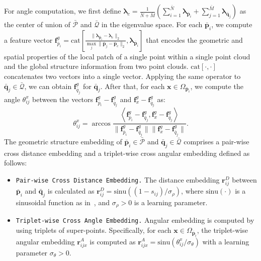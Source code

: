 For angle computation, we first define $\bm{\lambda}_c=\frac{1}{\bar{N}+\bar{M}}\left(\sum_{i=1}^{\bar{N}}\bm{\lambda}_{\bar{\bm{p}}_i} + \sum_{j=1}^{\bar{M}}\bm{\lambda}_{\bar{\bm{q}}_j}\right)$ as the center of union of $\bar{\bm{\mathcal{P}}}$ and $\bar{\bm{\mathcal{Q}}}$ in the eigenvalue space.
For each $\bar{\bm{p}}_i$, we compute a feature vector
$\bm{f}^g_{\bar{p}_i}= \mbox{cat}\left[\frac{\|\bm{\lambda}_{\bar{\bm{p}}_i}-{\bm{\lambda}}_c\|_2}{\max\limits_j\|\bar{\bm{p}}_j-\bar{\bm{p}}_c\|_2},\bm{\lambda}_{\bar{\bm{p}}_i}\right]$ that encodes the geometric and spatial properties of the local patch of a single point within a single point cloud and the global structure information from two point clouds.
$\mbox{cat}[\cdot, \cdot]$ concatenates two vectors into a single vector.
Applying the same operator to $\bar{\bm{q}}_j\in\bar{\bm{\mathcal{Q}}}$, we can obtain $\bm{f}^g_{\bar{q}_j}$ for $\bar{\bm{q}}_j$.
After that, for each ${\bm{x}\in\Omega_{\bar{\bm{p}}_i}}$, we compute the angle $\theta^x_{ij}$ between the vectors $\bm{f}^g_{\bar{p}_i}-\bm{f}^g_{\bar{q}_j}$ and $\bm{f}^g_{x}-\bm{f}^g_{\bar{q}_j}$ as:
\begin{equation}
    \theta^x_{ij} =\arccos\frac{\left<\bm{f}^g_{\bar{p}_i}-\bm{f}^g_{\bar{q}_j}, \bm{f}^g_{x}-\bm{f}^g_{\bar{q}_j}\right>}{\|\bm{f}^g_{\bar{p}_i}-\bm{f}^g_{\bar{q}_j}\|\| \bm{f}^g_{x}-\bm{f}^g_{\bar{q}_j}\|}.
\end{equation}
The geometric structure embedding of $\bar{\bm{p}}_i\in \bar{\bm{\mathcal{P}}}$ and $\bar{\bm{q}}_j\in \bar{\bm{\mathcal{Q}}}$ comprises a pair-wise cross distance embedding and a triplet-wise cross angular embedding defined as follows:
\begin{itemize}[noitemsep,topsep=0pt,leftmargin=*]
    \item{\verb|Pair-wise Cross Distance Embedding.|} The distance embedding $\bm{r}^D_{ij}$ between $\bar{\bm{p}}_i$ and $\bar{\bm{q}}_j$ is calculated as $\bm{r}^D_{ij}{=}\mbox{sinu}(\left(1-s_{ij}\right) {/} \sigma_{\rho})$, where $\mbox{sinu}(\cdot)$ is a sinusoidal function as in~\cite{vaswani2017attention}, and $\sigma_{\rho}{>}0$ is a learning parameter.
    \item{\verb|Triplet-wise Cross Angle Embedding.|} Angular embedding is computed by using triplets of super-points. 
    Specifically, for each ${\bm{x}\in\Omega_{\bar{\bm{p}}_i}}$, the triplet-wise angular embedding $\bm{r}^A_{ijx}$ is computed as 
    $\bm{r}^A_{ijx}{=}\mbox{sinu}(\theta^x_{ij}/\sigma_{\theta})$ with a learning parameter $\sigma_{\theta}{>}0$.
\end{itemize}
